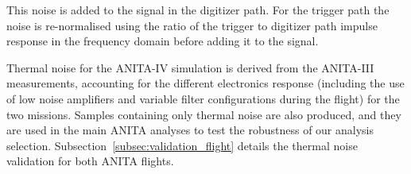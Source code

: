 This noise is added to the signal in the digitizer path.
For the trigger path the noise is re-normalised using the ratio of the
trigger to digitizer path impulse response in the frequency domain
before adding it to the signal.

Thermal noise for the ANITA-IV simulation is derived from the ANITA-III measurements, accounting for the different electronics response (including the use of low noise amplifiers and variable filter configurations during the flight) for the two missions.
Samples containing only thermal noise are also produced, and they are used in
the main ANITA analyses to test the robustness of our analysis selection.
Subsection~\ref{subsec:validation_flight} details the thermal noise validation for both ANITA flights.



